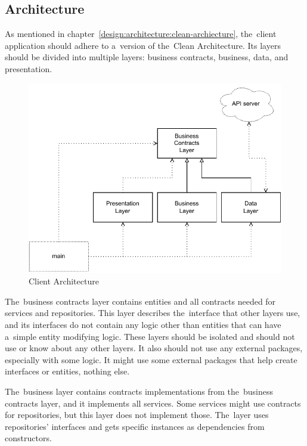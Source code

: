 \subsection{Architecture}

As mentioned in chapter~\ref{design:architecture:clean-archiecture}, the~client application should adhere to a~version of the~Clean Architecture.
Its layers should be divided into multiple layers: business contracts, business, data, and presentation.

\begin{figure}
    \centering
    \includegraphics[width=1\linewidth]{assets/design/clientarchitecture.pdf}
    \caption{Client Architecture}
    \label{fig:design:clientarchitecture}
\end{figure}

The~business contracts layer contains entities and all contracts needed for services and repositories.
This layer describes the~interface that other layers use, and its interfaces do not contain any logic other than entities that can have a~simple entity modifying logic.
These layers should be isolated and should not use or know about any other layers.
It also should not use any external packages, especially with some logic.
It might use some external packages that help create interfaces or entities, nothing else.

The~business layer contains contracts implementations from the~business contracts layer, and it implements all services.
Some services might use contracts for repositories, but this layer does not implement those.
The~layer uses repositories' interfaces and gets specific instances as dependencies from constructors.

